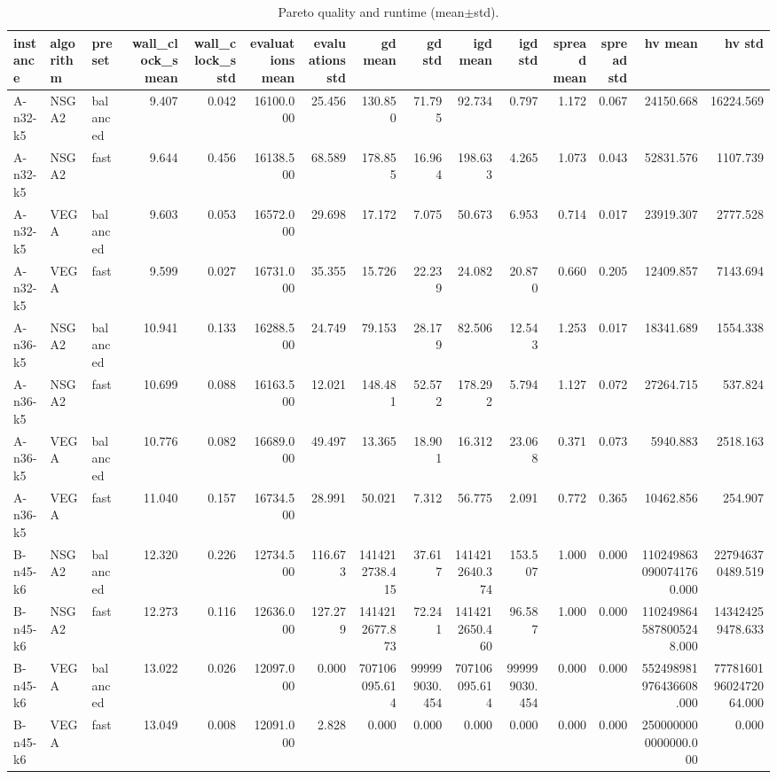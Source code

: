 \begin{table}
\caption{Pareto quality and runtime (mean$\pm$std).}
\label{tab:quality}
\begin{tabular}{lllrrrrrrrrrrrr}
\toprule
instance & algorithm & preset & wall_clock_s mean & wall_clock_s std & evaluations mean & evaluations std & gd mean & gd std & igd mean & igd std & spread mean & spread std & hv mean & hv std \\
\midrule
A-n32-k5 & NSGA2 & balanced & 9.407 & 0.042 & 16100.000 & 25.456 & 130.850 & 71.795 & 92.734 & 0.797 & 1.172 & 0.067 & 24150.668 & 16224.569 \\
A-n32-k5 & NSGA2 & fast & 9.644 & 0.456 & 16138.500 & 68.589 & 178.855 & 16.964 & 198.633 & 4.265 & 1.073 & 0.043 & 52831.576 & 1107.739 \\
A-n32-k5 & VEGA & balanced & 9.603 & 0.053 & 16572.000 & 29.698 & 17.172 & 7.075 & 50.673 & 6.953 & 0.714 & 0.017 & 23919.307 & 2777.528 \\
A-n32-k5 & VEGA & fast & 9.599 & 0.027 & 16731.000 & 35.355 & 15.726 & 22.239 & 24.082 & 20.870 & 0.660 & 0.205 & 12409.857 & 7143.694 \\
A-n36-k5 & NSGA2 & balanced & 10.941 & 0.133 & 16288.500 & 24.749 & 79.153 & 28.179 & 82.506 & 12.543 & 1.253 & 0.017 & 18341.689 & 1554.338 \\
A-n36-k5 & NSGA2 & fast & 10.699 & 0.088 & 16163.500 & 12.021 & 148.481 & 52.572 & 178.292 & 5.794 & 1.127 & 0.072 & 27264.715 & 537.824 \\
A-n36-k5 & VEGA & balanced & 10.776 & 0.082 & 16689.000 & 49.497 & 13.365 & 18.901 & 16.312 & 23.068 & 0.371 & 0.073 & 5940.883 & 2518.163 \\
A-n36-k5 & VEGA & fast & 11.040 & 0.157 & 16734.500 & 28.991 & 50.021 & 7.312 & 56.775 & 2.091 & 0.772 & 0.365 & 10462.856 & 254.907 \\
B-n45-k6 & NSGA2 & balanced & 12.320 & 0.226 & 12734.500 & 116.673 & 1414212738.415 & 37.617 & 1414212640.374 & 153.507 & 1.000 & 0.000 & 1102498630900741760.000 & 227946370489.519 \\
B-n45-k6 & NSGA2 & fast & 12.273 & 0.116 & 12636.000 & 127.279 & 1414212677.873 & 72.241 & 1414212650.460 & 96.587 & 1.000 & 0.000 & 1102498645878005248.000 & 143424259478.633 \\
B-n45-k6 & VEGA & balanced & 13.022 & 0.026 & 12097.000 & 0.000 & 707106095.614 & 999999030.454 & 707106095.614 & 999999030.454 & 0.000 & 0.000 & 552498981976436608.000 & 777816019602472064.000 \\
B-n45-k6 & VEGA & fast & 13.049 & 0.008 & 12091.000 & 2.828 & 0.000 & 0.000 & 0.000 & 0.000 & 0.000 & 0.000 & 2500000000000000.000 & 0.000 \\

\end{tabular}
\end{table}
